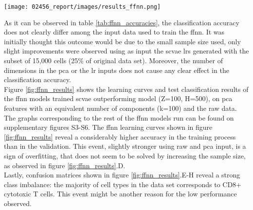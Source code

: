 \documentclass{article}
\begin{document}
\begin{figure*}[h]
    \centering
    \texttt{[image: 02456\_report/images/results\_ffnn.png]}
    \caption{\small{
    \gls{ffnn} classification results.
    A-D: 
    learning curves of model trained on raw data (A), model trained on \gls{pca} features ($k=100$) (B), 
    model trained on outperforming \gls{scvae} \gls{lr} ($Z=100, H=500$) (C),
    model trained on outperforming \gls{scvae} \gls{lr} ($Z=100, H=500$) using the subset of 15000 cells (D). 
    Red curve: training accuracy; blue curve: validation accuracy. 
    E-F:
    confusion matrices of test set from the model trained on raw data (E),
    model trained on \gls{pca} features ($k=100$) (F), 
    model trained on outperforming \gls{scvae} \gls{lr} ($Z=100, H=500$) (G),
    model trained on outperforming \gls{scvae} \gls{lr} ($Z=100, H=500$) using the subset of 15,000 cells (H).
    }}
    \label{fig:ffnn_results}
    
\end{figure*}


\noindent As it can be observed in table \ref{tab:ffnn_accuracies}, the classification accuracy does not clearly differ among the input data used to train the \gls{ffnn}.
It was initially thought this outcome would be due to the small sample size used, only slight improvements were observed using as input the \gls{scvae} \glspl{lr} generated with the subset of 15,000 cells (25\% of original data set).
Moreover, the number of dimensions in the \gls{pca} or the \gls{lr} inputs does not cause any clear effect in the classification accuracy. \\

\noindent Figure \ref{fig:ffnn_results} shows the learning curves and test classification results of the \gls{ffnn} models trained \gls{scvae} outperforming model (Z=100, H=500), on \gls{pca} features with an equivalent number of components (k=100) and the raw data.
The graphs corresponding to the rest of the \gls{ffnn} models run can be found on supplementary figures S3-S6.
The \gls{ffnn} learning curves shown in figure \ref{fig:ffnn_results} reveal a considerably higher accuracy in the training process than in the validation. 
This event, slightly stronger using raw and \gls{pca}
input, is a sign of overfitting, %
that does not seem to be solved by increasing the sample size, as observed in figure \ref{fig:ffnn_results}.D. \\

\noindent Lastly, confusion matrices shown in figure \ref{fig:ffnn_results}.E-H reveal a strong class imbalance: the majority of cell types in the data set corresponds to CD8+ cytotoxic T cells. 
This event might be another reason for the low performance observed.
\end{document}
